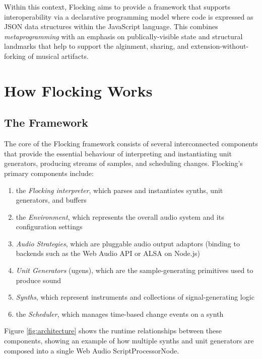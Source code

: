 \documentclass{article}
\begin{document}
Within this context, Flocking aims to provide a framework that supports interoperability via a declarative programming model where code is expressed as JSON data structures within the JavaScript language. This combines {\it metaprogramming} with an emphasis on publically-visible state and structural landmarks that help to support the alginment, sharing, and extension-without-forking of musical artifacts.

\section{How Flocking Works}

\subsection{The Framework}

The core of the Flocking framework consists of several interconnected components that provide the essential behaviour of interpreting and instantiating unit generators, producing streams of samples, and scheduling changes. Flocking's primary components include:

\begin{enumerate}
\item the {\it Flocking interpreter}, which parses and instantiates synths, unit generators, and buffers
\item the {\it Environment}, which represents the overall audio system and its configuration settings
\item {\it Audio Strategies}, which are pluggable audio output adaptors (binding to backends such as the Web Audio API or ALSA on Node.js)
\item {\it Unit Generators} (ugens), which are the sample-generating primitives used to produce sound
\item {\it Synths}, which represent instruments and collections of signal-generating logic
\item the {\it Scheduler}, which manages time-based change events on a synth
\end{enumerate}

Figure \ref{fig:architecture} shows the runtime relationships between these components, showing an example of how multiple synths and unit generators are composed into a single Web Audio ScriptProcessorNode.
\end{document}
